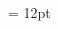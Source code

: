 \documentclass[gps1,twoside]{article}
\begin{document}
\begin{multicols}{2}
\begin{spacing}{0.458333333333333}{\raggedright}
 \end{spacing}\end{multicols}\begin{spacing}{0.916666666666667}\begin{center}\begin{center}

\section*{}\end{center}
\end{center}\end{spacing}\setlength{\columnsep}{12pt} 
\setlength\columnseprule{0.4pt} 
\begin{multicols}{2}\begin{spacing}{0.458333333333333}{\raggedright} \begin{spacing}{0.458333333333333}
\hangindent= 12pt
 \headwordggoTeluINentryletDatadicBody{}\spanenpronunciationggofonipaxemicpronunciationsentryletDatadicBody{[}\spanenpronunciationggofonipaxemicpronunciationsentryletDatadicBody{]}  \grammaticalinfosensesensesentryletDatadicBody{} \end{spacing}
 \end{spacing}\end{multicols}
\end{document}
